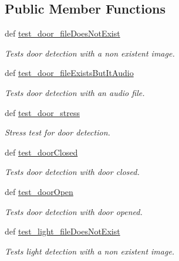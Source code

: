 \subsection*{Public Member Functions}
\begin{DoxyCompactItemize}
\item 
def \hyperlink{classfunctional__tests_1_1HazardDetectionFunc_a6739185482d2c5f7cde169c6886539ba}{test\-\_\-door\-\_\-file\-Does\-Not\-Exist}
\begin{DoxyCompactList}\small\item\em Tests door detection with a non existent image. \end{DoxyCompactList}\item 
def \hyperlink{classfunctional__tests_1_1HazardDetectionFunc_a8ca5e1177b66e47ac324f7ba5afa3140}{test\-\_\-door\-\_\-file\-Exists\-But\-It\-Audio}
\begin{DoxyCompactList}\small\item\em Tests door detection with an audio file. \end{DoxyCompactList}\item 
def \hyperlink{classfunctional__tests_1_1HazardDetectionFunc_a99db6ebab4549f2298f1a5c44e624cab}{test\-\_\-door\-\_\-stress}
\begin{DoxyCompactList}\small\item\em Stress test for door detection. \end{DoxyCompactList}\item 
def \hyperlink{classfunctional__tests_1_1HazardDetectionFunc_a06a923f5605a45e2452e6e35bb5fd71d}{test\-\_\-door\-Closed}
\begin{DoxyCompactList}\small\item\em Tests door detection with door closed. \end{DoxyCompactList}\item 
def \hyperlink{classfunctional__tests_1_1HazardDetectionFunc_aca9f03338d6a0abcd5b0ac5910ddbff0}{test\-\_\-door\-Open}
\begin{DoxyCompactList}\small\item\em Tests door detection with door opened. \end{DoxyCompactList}\item 
def \hyperlink{classfunctional__tests_1_1HazardDetectionFunc_a856f9fa970bc64e63097d48efe89c49a}{test\-\_\-light\-\_\-file\-Does\-Not\-Exist}
\begin{DoxyCompactList}\small\item\em Tests light detection with a non existent image. \end{DoxyCompactList}\item 

\end{DoxyCompactItemize}

